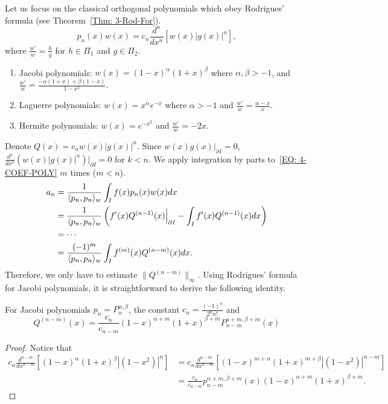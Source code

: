 Let us focus on the classical orthogonal polynomials which obey Rodrigues' formula (see Theorem~\ref{Thm: 3-Rod-For}). 
\begin{equation}
    p_n(x) w(x) = c_n \frac{d^n}{dx^n} \left[w(x) |g(x)|^n\right],  
\end{equation}
where $\frac{w'}{w} = \frac{h}{g}$ for $h\in \Pi_1$ and $g\in \Pi_2$. 
\begin{enumerate}
    \item Jacobi polynomials: $w(x) = (1-x)^{\alpha} (1+x)^{\beta}$ where $\alpha, \beta>-1$, and $\frac{w'}{w} = \frac{-\alpha(1+x) + \beta(1-x)}{1-x^2}$. 
    \item Laguerre polynomials: $w(x) = x^{\alpha} e^{-x}$ where $\alpha>-1$ and $\frac{w'}{w} = \frac{\alpha-x}{x}$. 
    \item Hermite polynomials: $w(x) = e^{-x^2}$ and $\frac{w'}{w} = -2x$. 
\end{enumerate}
Denote $Q(x) = c_n w(x) |g(x)|^n$. Since $w(x)g(x)|_{\partial I} = 0$, $\frac{d^k}{dx^k} (w(x) |g(x)|^n )|_{\partial I} = 0$ for $k <n$.  We apply integration by parts to~\eqref{EQ: 4-COEF-POLY} $m$ times ($m < n$). 
\begin{equation}
\begin{aligned}
    a_n &= \frac{1}{ \langle {p_n, p_n} \rangle_w}\int_I f(x) p_n(x) w(x) dx \\
    &= \frac{1}{ \langle {p_n, p_n} \rangle_w}\left( f'(x) Q^{(n-1)}(x)\Big|_{\partial I} - \int_{I} f'(x) Q^{(n-1)}(x) dx \right) \\
    &= \cdots \\
    &= \frac{(-1)^m }{\langle {p_n, p_n} \rangle_w} \int_{I} f^{(m)}(x) Q^{(n-m)}(x) dx. 
\end{aligned}
\end{equation}
Therefore, we only have to estimate $\|Q^{(n - m)}\|_{\infty}$. Using Rodrigues' formula for Jacobi polynomials, it is straightforward to derive the following identity.
\begin{lemma}
\label{Lem: 4-Int-Ort-Pol}
    For Jacobi polynomials $p_n = P_{n}^{\alpha, \beta}$,  the constant $c_n = \frac{(-1)^{n}}{2^n n!}$ and \begin{equation}
        Q^{(n - m)}(x) = \frac{c_n}{c_{n-m}} (1-x)^{\alpha+m}(1+x)^{\beta+m} P_{n-m}^{a+m, \beta + m}(x)
    \end{equation}
\end{lemma}
\begin{proof}
    Notice that 
    \begin{equation}\nonumber
    \begin{aligned}
        c_n \frac{d^{n-m}}{d x^{n-m}} \left[(1-x)^{\alpha}(1+x)^{\beta} |(1-x^2)|^n\right] &= c_n  \frac{d^{n-m}}{d x^{n-m}}  \left[ (1-x)^{m+\alpha}(1+x)^{m+\beta} |(1-x^2)|^{n-m} \right] \\
        &=  \frac{c_n}{c_{n-m}} p_{n-m}^{\alpha+m, \beta+m}(x) (1 - x)^{\alpha+m} (1+x)^{\beta+m}. 
    \end{aligned}
    \end{equation}
\end{proof}
